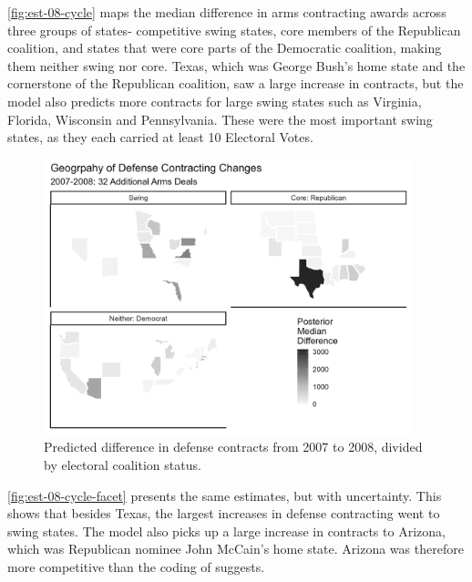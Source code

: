 \documentclass[12pt]{article}
\begin{document}
\autoref{fig:est-08-cycle} maps the median difference in arms contracting awards across three groups of states- competitive swing states, core members of the Republican coalition, and states that were core parts of the Democratic coalition, making them neither swing nor core. 
Texas, which was George Bush's home state and the cornerstone of the Republican coalition, saw a large increase in contracts, but the model also predicts more contracts for large swing states such as Virginia, Florida, Wisconsin and Pennsylvania. 
These were the most important swing states, as they each carried at least 10 Electoral Votes. 


\begin{figure}[htpb]
	\centering
		\includegraphics[width=0.95\textwidth]{est-08-cycle.png}
	\caption{Predicted difference in defense contracts from 2007 to 2008, divided by electoral coalition status.}
	\label{fig:est-08-cycle}
\end{figure}


\autoref{fig:est-08-cycle-facet} presents the same estimates, but with uncertainty. 
This shows that besides Texas, the largest increases in defense contracting went to swing states. 
The model also picks up a large increase in contracts to Arizona, which was Republican nominee John McCain's home state.
Arizona was therefore more competitive than the coding of \citet{KrinerReeves2015} suggests. 
\end{document}
